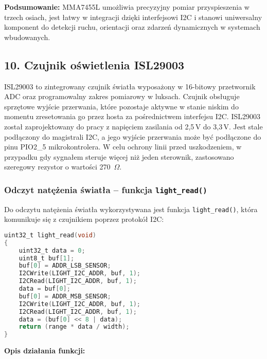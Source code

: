 \documentclass[a4paper,12pt]{report}
\begin{document}
\textbf{Podsumowanie:}  
MMA7455L umożliwia precyzyjny pomiar przyspieszenia w trzech osiach, jest łatwy w integracji dzięki interfejsowi I2C i stanowi uniwersalny komponent do detekcji ruchu, orientacji oraz zdarzeń dynamicznych w systemach wbudowanych.

\subsection*{10. Czujnik oświetlenia ISL29003}

ISL29003 to zintegrowany czujnik światła wyposażony w 16-bitowy przetwornik ADC oraz programowalny zakres pomiarowy w luksach. Czujnik obsługuje sprzętowe wyjście przerwania, które pozostaje aktywne w stanie niskim do momentu zresetowania go przez hosta za pośrednictwem interfejsu I2C. ISL29003 został zaprojektowany do pracy z napięciem zasilania od 2,5\,V do 3,3\,V. Jest stale podłączony do magistrali I2C, a jego wyjście przerwania może być podłączone do pinu PIO2\_5 mikrokontrolera. W celu ochrony linii przed uszkodzeniem, w przypadku gdy sygnałem steruje więcej niż jeden sterownik, zastosowano szeregowy rezystor o wartości 270~$\Omega$.

\subsubsection*{Odczyt natężenia światła – funkcja \texttt{light\_read()}}

Do odczytu natężenia światła wykorzystywana jest funkcja \texttt{light\_read()}, która komunikuje się z czujnikiem poprzez protokół I2C:

\begin{lstlisting}[language=C]
uint32_t light_read(void)
{
    uint32_t data = 0;
    uint8_t buf[1];
    buf[0] = ADDR_LSB_SENSOR;
    I2CWrite(LIGHT_I2C_ADDR, buf, 1);
    I2CRead(LIGHT_I2C_ADDR, buf, 1);
    data = buf[0];
    buf[0] = ADDR_MSB_SENSOR;
    I2CWrite(LIGHT_I2C_ADDR, buf, 1);
    I2CRead(LIGHT_I2C_ADDR, buf, 1);
    data = (buf[0] << 8 | data);
    return (range * data / width);
}
\end{lstlisting}

\textbf{Opis działania funkcji:}
\end{document}
